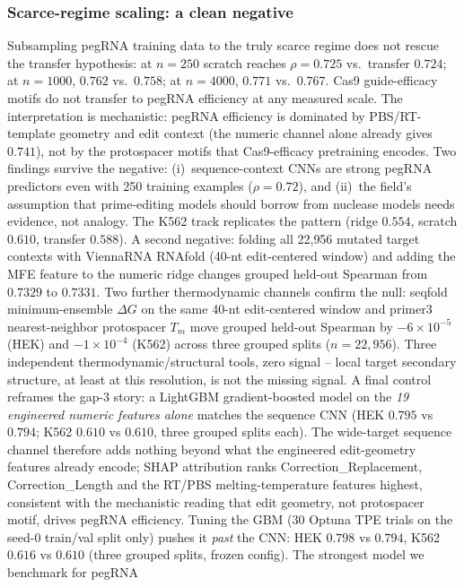 \documentclass[12pt]{article}
\begin{document}
\subsubsection{Scarce-regime scaling: a clean negative}
Subsampling pegRNA training data to the truly scarce regime does not rescue
the transfer hypothesis: at $n=250$ scratch reaches $\rho=0.725$ vs.\
transfer $0.724$; at $n=1000$, $0.762$ vs.\ $0.758$; at $n=4000$, $0.771$
vs.\ $0.767$. Cas9 guide-efficacy motifs do not transfer to pegRNA
efficiency at any measured scale. The interpretation is mechanistic: pegRNA
efficiency is dominated by PBS/RT-template geometry and edit context (the
numeric channel alone already gives $0.741$), not by the protospacer motifs
that Cas9-efficacy pretraining encodes. Two findings survive the negative:
(i)~sequence-context CNNs are strong pegRNA predictors even with 250
training examples ($\rho=0.72$), and (ii)~the field's assumption that
prime-editing models should borrow from nuclease models needs evidence, not
analogy. The K562 track replicates the pattern (ridge $0.554$, scratch
$0.610$, transfer $0.588$). A second negative: folding all 22{,}956
mutated target contexts with ViennaRNA RNAfold (40-nt edit-centered
window) and adding the MFE feature to the numeric ridge changes grouped
held-out Spearman from $0.7329$ to $0.7331$. Two further thermodynamic
channels confirm the null: seqfold minimum-ensemble $\Delta G$ on the same
40-nt edit-centered window and primer3 nearest-neighbor protospacer $T_m$
move grouped held-out Spearman by $-6\times10^{-5}$ (HEK) and
$-1\times10^{-4}$ (K562) across three grouped splits
($n=22{,}956$). Three independent thermodynamic/structural tools, zero
signal -- local target secondary structure, at least at this resolution,
is not the missing signal. A final control reframes the gap-3 story: a
LightGBM gradient-boosted model on the \emph{19 engineered numeric
features alone} matches the sequence CNN (HEK $0.795$ vs $0.794$; K562
$0.610$ vs $0.610$, three grouped splits each). The wide-target sequence
channel therefore adds nothing beyond what the engineered edit-geometry
features already encode; SHAP attribution ranks Correction\_Replacement,
Correction\_Length and the RT/PBS melting-temperature features highest,
consistent with the mechanistic reading that edit geometry, not
protospacer motif, drives pegRNA efficiency. Tuning the GBM (30 Optuna
TPE trials on the seed-0 train/val split only) pushes it \emph{past} the
CNN: HEK $0.798$ vs $0.794$, K562 $0.616$ vs $0.610$ (three grouped
splits, frozen config). The strongest model we benchmark for pegRNA
\end{document}
